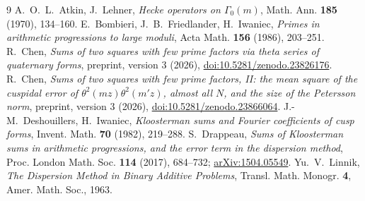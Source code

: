 \documentclass[11pt,a4paper]{article}
\theoremstyle{remark}
\theoremstyle{definition}
\begin{document}
\begin{thebibliography}{9}
 A.~O.~L.~Atkin, J.~Lehner, \emph{Hecke operators on $\Gamma_0(m)$}, Math. Ann. \textbf{185} (1970), 134--160.
 E.~Bombieri, J.~B.~Friedlander, H.~Iwaniec, \emph{Primes in arithmetic progressions to large moduli}, Acta Math. \textbf{156} (1986), 203--251.
 R.~Chen, \emph{Sums of two squares with few prime factors via theta series of quaternary forms}, preprint, version 3 (2026), \href{https://doi.org/10.5281/zenodo.23826176}{doi:10.5281/zenodo.23826176}.
 R.~Chen, \emph{Sums of two squares with few prime factors, II: the mean square of the cuspidal error of $\theta^2(mz)\theta^2(m'z)$, almost all $N$, and the size of the Petersson norm}, preprint, version 3 (2026), \href{https://doi.org/10.5281/zenodo.23866064}{doi:10.5281/zenodo.23866064}.
 J.-M.~Deshouillers, H.~Iwaniec, \emph{Kloosterman sums and Fourier coefficients of cusp forms}, Invent. Math. \textbf{70} (1982), 219--288.
 S.~Drappeau, \emph{Sums of Kloosterman sums in arithmetic progressions, and the error term in the dispersion method}, Proc. London Math. Soc. \textbf{114} (2017), 684--732; \href{https://arxiv.org/abs/1504.05549}{arXiv:1504.05549}.
 Yu.~V.~Linnik, \emph{The Dispersion Method in Binary Additive Problems}, Transl. Math. Monogr. \textbf{4}, Amer. Math. Soc., 1963.
\end{thebibliography}
\end{document}
